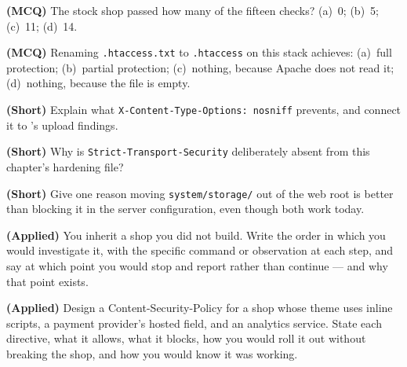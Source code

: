 \begin{reviewq}
  \item \textbf{(MCQ)} The stock shop passed how many of the fifteen checks?
        (a)~0; (b)~5; (c)~11; (d)~14.
  \item \textbf{(MCQ)} Renaming \texttt{.htaccess.txt} to \texttt{.htaccess}
        on this stack achieves: (a)~full protection; (b)~partial protection;
        (c)~nothing, because Apache does not read it; (d)~nothing, because the
        file is empty.
  \item \textbf{(Short)} Explain what \texttt{X-Content-Type-Options: nosniff}
        prevents, and connect it to 's upload findings.
  \item \textbf{(Short)} Why is \texttt{Strict-Transport-Security} deliberately
        absent from this chapter's hardening file?
  \item \textbf{(Short)} Give one reason moving \texttt{system/storage/} out of
        the web root is better than blocking it in the server configuration,
        even though both work today.
  \item \textbf{(Applied)} You inherit a shop you did not build. Write the
        order in which you would investigate it, with the specific command or
        observation at each step, and say at which point you would stop and
        report rather than continue --- and why that point exists.
  \item \textbf{(Applied)} Design a Content-Security-Policy for a shop whose
        theme uses inline scripts, a payment provider's hosted field, and an
        analytics service. State each directive, what it allows, what it
        blocks, how you would roll it out without breaking the shop, and how
        you would know it was working.
\end{reviewq}
